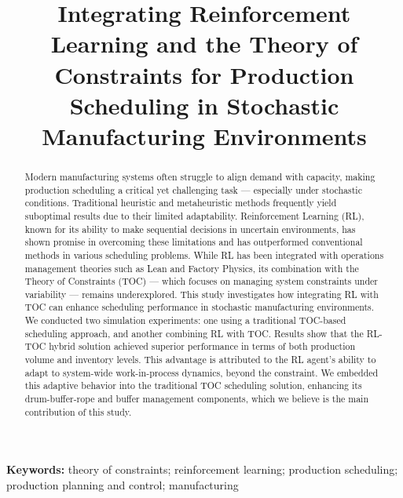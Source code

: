 \documentclass[11pt]{article}
\title{Integrating Reinforcement Learning and the Theory of Constraints for
Production Scheduling in Stochastic Manufacturing Environments}
\author{}
\date{}
\begin{document}
\maketitle

\begin{abstract}
Modern manufacturing systems often struggle to align demand with capacity,
making production scheduling a critical yet challenging task --- especially
under stochastic conditions. Traditional heuristic and metaheuristic methods
frequently yield suboptimal results due to their limited adaptability.
Reinforcement Learning (RL), known for its ability to make sequential
decisions in uncertain environments, has shown promise in overcoming these
limitations and has outperformed conventional methods in various scheduling
problems. While RL has been integrated with operations management theories
such as Lean and Factory Physics, its combination with the Theory of
Constraints (TOC) --- which focuses on managing system constraints under
variability --- remains underexplored. This study investigates how
integrating RL with TOC can enhance scheduling performance in stochastic
manufacturing environments. We conducted two simulation experiments: one
using a traditional TOC-based scheduling approach, and another combining RL
with TOC. Results show that the RL-TOC hybrid solution achieved superior
performance in terms of both production volume and inventory levels. This
advantage is attributed to the RL agent's ability to adapt to system-wide
work-in-process dynamics, beyond the constraint. We embedded this adaptive
behavior into the traditional TOC scheduling solution, enhancing its
drum-buffer-rope and buffer management components, which we believe is the
main contribution of this study.
\end{abstract}

\noindent\textbf{Keywords:} theory of constraints; reinforcement learning;
production scheduling; production planning and control; manufacturing
















\nocite{*}
\printbibliography
\end{document}
